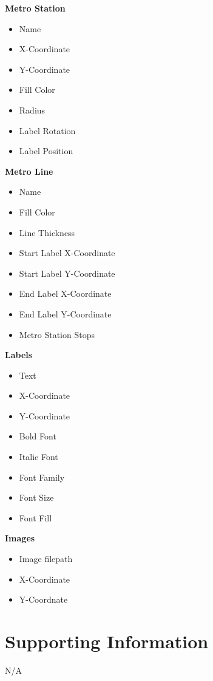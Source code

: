 \documentclass[10pt,a4paper]{article}
\begin{document}
\textbf{Metro Station}
\begin{itemize}
\item Name
\item X-Coordinate
\item Y-Coordinate
\item Fill Color
\item Radius
\item Label Rotation
\item Label Position
\end{itemize}

\textbf{Metro Line}
\begin{itemize}
\item Name
\item Fill Color
\item Line Thickness
\item Start Label X-Coordinate
\item Start Label Y-Coordinate
\item End Label X-Coordinate
\item End Label Y-Coordinate
\item Metro Station Stops
\end{itemize}

\textbf{Labels}
\begin{itemize}
\item Text
\item X-Coordinate
\item Y-Coordinate
\item Bold Font
\item Italic Font
\item Font Family
\item Font Size
\item Font Fill
\end{itemize}

\textbf{Images}
\begin{itemize}
\item Image filepath
\item X-Coordinate
\item Y-Coordnate
\end{itemize}

\section{Supporting Information}
N/A
\end{document}
